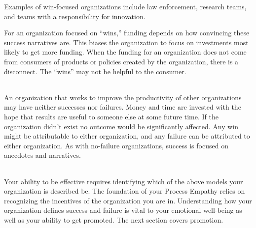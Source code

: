Examples of win-focused organizations include law enforcement, research teams, and teams with a responsibility for innovation. 

For an organization focused on ``wins,'' funding depends on how convincing these success narratives are. This biases the organization to focus on investments most likely to get more funding. When the funding for an organization does not come from consumers of products or policies created by the organization, there is a disconnect. The ``wins'' may not be helpful to the consumer.


\ \\

An organization that works to improve the productivity of other organizations may have neither successes nor failures. Money and time are invested with the hope that results are useful to someone else at some future time. If the organization didn't exist no outcome would be significantly affected. Any win might be attributable to either organization, and any failure can be attributed to either organization. As with no-failure organizations, success is focused on anecdotes and narratives. 

\ \\

Your ability to be effective requires identifying which of the above models your organization is described be. The foundation of your Process Empathy relies on recognizing the incentives of the organization you are in.
Understanding how your organization defines success and failure is vital to your emotional well-being as well as your ability to get promoted. The next section covers promotion.